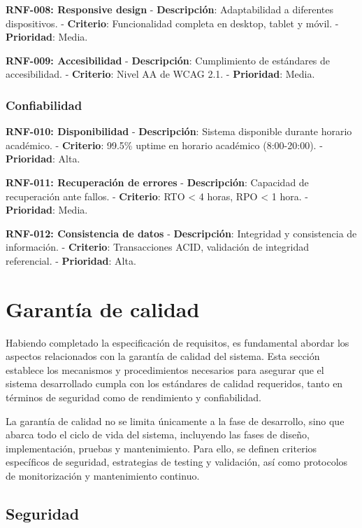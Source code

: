 \documentclass[12pt,a4paper,oneside]{report}
\begin{document}
\textbf{RNF-008: Responsive design} - \textbf{Descripción}:
Adaptabilidad a diferentes dispositivos. - \textbf{Criterio}:
Funcionalidad completa en desktop, tablet y móvil. - \textbf{Prioridad}:
Media.

\textbf{RNF-009: Accesibilidad} - \textbf{Descripción}: Cumplimiento de
estándares de accesibilidad. - \textbf{Criterio}: Nivel AA de WCAG 2.1.
- \textbf{Prioridad}: Media.

\subsubsection{Confiabilidad}\label{confiabilidad}

\textbf{RNF-010: Disponibilidad} - \textbf{Descripción}: Sistema
disponible durante horario académico. - \textbf{Criterio}: 99.5\% uptime
en horario académico (8:00-20:00). - \textbf{Prioridad}: Alta.

\textbf{RNF-011: Recuperación de errores} - \textbf{Descripción}:
Capacidad de recuperación ante fallos. - \textbf{Criterio}: RTO
\textless{} 4 horas, RPO \textless{} 1 hora. - \textbf{Prioridad}:
Media.

\textbf{RNF-012: Consistencia de datos} - \textbf{Descripción}:
Integridad y consistencia de información. - \textbf{Criterio}:
Transacciones ACID, validación de integridad referencial. -
\textbf{Prioridad}: Alta.

\section{Garantía de calidad}\label{garantuxeda-de-calidad}

Habiendo completado la especificación de requisitos, es fundamental
abordar los aspectos relacionados con la garantía de calidad del
sistema. Esta sección establece los mecanismos y procedimientos
necesarios para asegurar que el sistema desarrollado cumpla con los
estándares de calidad requeridos, tanto en términos de seguridad como de
rendimiento y confiabilidad.

La garantía de calidad no se limita únicamente a la fase de desarrollo,
sino que abarca todo el ciclo de vida del sistema, incluyendo las fases
de diseño, implementación, pruebas y mantenimiento. Para ello, se
definen criterios específicos de seguridad, estrategias de testing y
validación, así como protocolos de monitorización y mantenimiento
continuo.

\subsection{Seguridad}\label{seguridad-1}
\end{document}
